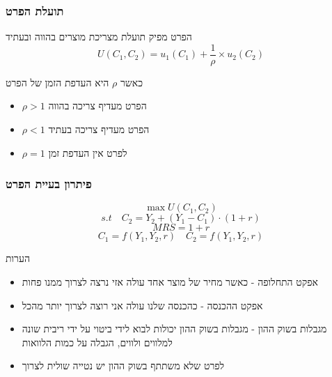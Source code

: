 \documentclass[usenames,dvipsnames]{beamer}
\begin{document}
\begin{RTL}
    


\begin{frame}
    \frametitle{תועלת הפרט}
    הפרט מפיק תועלת מצריכת מוצרים בהווה ובעתיד
    \begin{equation*}
        U(C_1,C_2) = u_1(C_1) + \frac{1}{\rho} \times u_2(C_2)
    \end{equation*}

    כאשר $\rho$ היא העדפת הזמן של הפרט
    \begin{itemize}
        \item $\rho > 1$ הפרט מעדיף צריכה בהווה
        \item $\rho < 1$ הפרט מעדיף צריכה בעתיד
        \item $\rho = 1$ לפרט אין העדפת זמן
    \end{itemize}    

\end{frame}

\begin{frame}
    \frametitle{פיתרון בעיית הפרט}
    \begin{equation}
        \max U(C_1,C_2) 
    \end{equation}
    \begin{equation}
        s.t \quad C_2 = Y_2 + (Y_1 - C_1) \cdot (1+r)
    \end{equation}
    \begin{equation}
        MRS = 1+r
    \end{equation}
    \begin{equation}
        C_1 = f\left(Y_1,Y_2,r\right)  \quad C_2 = f\left(Y_1,Y_2,r\right)
    \end{equation}
\end{frame}

\begin{frame}{הערות}
    \begin{itemize}
        \item אפקט התחלופה - כאשר מחיר של מוצר אחד עולה אזי נרצה לצרוך ממנו פחות
        \item אפקט ההכנסה - כהכנסה שלנו עולה אני רוצה לצרוך יותר מהכל
        \item מגבלות בשוק ההון - מגבלות בשוק ההון יכולות לבוא לידי ביטוי על ידי ריבית שונה למלווים ולווים, הגבלה על כמות הלוואות
        \item לפרט שלא משתתף בשוק ההון יש נטייה שולית לצרוך
    \end{itemize}
    
\end{frame}
\end{RTL}
\end{document}
